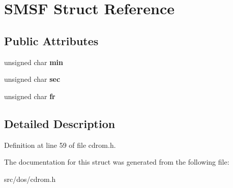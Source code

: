 \hypertarget{structSMSF}{\section{S\-M\-S\-F Struct Reference}
\label{structSMSF}
}
\subsection*{Public Attributes}
\begin{DoxyCompactItemize}
\item 
\hypertarget{structSMSF_a255d0543dd1a6ed1ef98d1554a305b1c}{unsigned char {\bfseries min}}\label{structSMSF_a255d0543dd1a6ed1ef98d1554a305b1c}

\item 
\hypertarget{structSMSF_a03726b294328a234ca219fdcdcf59b41}{unsigned char {\bfseries sec}}\label{structSMSF_a03726b294328a234ca219fdcdcf59b41}

\item 
\hypertarget{structSMSF_a7e7a172427d5827e25ed35c3f62a2ce5}{unsigned char {\bfseries fr}}\label{structSMSF_a7e7a172427d5827e25ed35c3f62a2ce5}

\end{DoxyCompactItemize}


\subsection{Detailed Description}


Definition at line 59 of file cdrom.\-h.



The documentation for this struct was generated from the following file\-:\begin{DoxyCompactItemize}
\item 
src/dos/cdrom.\-h\end{DoxyCompactItemize}

